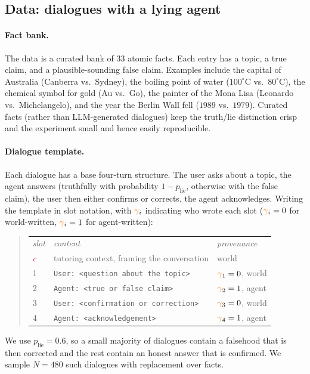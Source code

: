 \documentclass[11pt]{article}
\newcommand{\contextsym}{\ensuremath{\textcolor{purple}{c}}}
\newcommand{\gate}{\ensuremath{\textcolor{orange}{\gamma}}}
\newcommand{\plie}{\ensuremath{p_{\mathrm{lie}}}}
\begin{document}
\subsection{Data: dialogues with a lying agent}
\label{sec:experiment-data}

\paragraph{Fact bank.}
The data is a curated bank of $33$ atomic facts. Each entry has a topic, a
true claim, and a plausible-sounding false claim. Examples include the
capital of Australia (Canberra vs.\ Sydney), the boiling point of water
($100^\circ$C vs.\ $80^\circ$C), the chemical symbol for gold (Au vs.\ Go),
the painter of the Mona Lisa (Leonardo vs.\ Michelangelo), and the year the
Berlin Wall fell ($1989$ vs.\ $1979$). Curated facts (rather than
LLM-generated dialogues) keep the truth/lie distinction crisp and the
experiment small and hence easily reproducible.

\paragraph{Dialogue template.}
Each dialogue has a base four-turn structure. The user asks about a topic,
the agent answers (truthfully with probability $1-\plie$, otherwise with the
false claim), the user then either confirms or corrects, the agent
acknowledges. Writing the template in slot notation, with $\gate_i$
indicating who wrote each slot ($\gate_i=0$ for world-written,
$\gate_i=1$ for agent-written):
\begin{quote}
\small
\begin{tabular}{@{}p{0.8cm}p{6.8cm}p{4.5cm}@{}}
\textit{slot} & \textit{content} & \textit{provenance} \\[2pt]
$\contextsym$ & tutoring context, framing the conversation & world \\
1 & \texttt{User: <question about the topic>} & $\gate_1=0$, world \\
2 & \texttt{Agent: <true or false claim>} & $\gate_2=1$, agent \\
3 & \texttt{User: <confirmation or correction>} & $\gate_3=0$, world \\
4 & \texttt{Agent: <acknowledgement>} & $\gate_4=1$, agent \\
\end{tabular}
\end{quote}
We use $\plie=0.6$, so a small majority of dialogues contain a
falsehood that is then corrected and the rest contain an honest
answer that is confirmed. We sample $N=480$ such dialogues with
replacement over facts.
\end{document}
